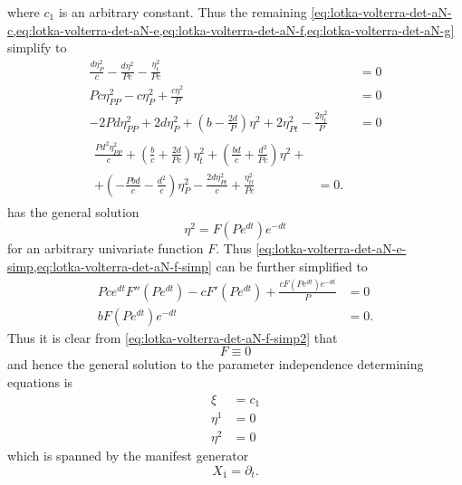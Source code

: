 where \(c_1\) is an arbitrary constant.
Thus the remaining \cref{eq:lotka-volterra-det-aN-c,eq:lotka-volterra-det-aN-e,eq:lotka-volterra-det-aN-f,eq:lotka-volterra-det-aN-g} simplify to
\begin{subequations}
  \begin{align}
    \frac{d \eta^2_{P}}{c} - \frac{d \eta^{2}}{P c} - \frac{\eta^2_{t}}{P c} &= 0 \label{eq:lotka-volterra-det-aN-c-simp}\\
    P c \eta^2_{PP} - c \eta^2_{P} + \frac{c \eta^{2}}{P} &= 0 \label{eq:lotka-volterra-det-aN-e-simp}\\
    - 2 P d \eta^2_{PP} + 2 d \eta^2_{P} + \left(b - \frac{2 d}{P}\right) \eta^{2} + 2 \eta^2_{Pt} - \frac{2 \eta^2_{t}}{P} &= 0 \label{eq:lotka-volterra-det-aN-f-simp}\\
    \begin{split}
      \frac{P d^{2} \eta^2_{PP}}{c} + \left(\frac{b}{c} + \frac{2 d}{P c}\right) \eta^2_{t} + \left(\frac{b d}{c} + \frac{d^{2}}{P c}\right) \eta^{2} +&\\
      + \left(- \frac{P b d}{c} - \frac{d^{2}}{c}\right) \eta^2_{P} - \frac{2 d \eta^2_{Pt}}{c} + \frac{\eta^2_{tt}}{P c} &= 0.
    \end{split}
  \end{align}
\end{subequations}
 has the general solution
\begin{equation*}
  \eta^{2} = F{\left(P e^{d t} \right)} e^{- d t}
\end{equation*}
for an arbitrary univariate function \(F\).
Thus \cref{eq:lotka-volterra-det-aN-e-simp,eq:lotka-volterra-det-aN-f-simp} can be further simplified to
\begin{subequations}
  \begin{align}
    P c e^{d t} F''{\left(P e^{d t} \right)} - c F'{\left(P e^{d t} \right)} + \frac{c F{\left(P e^{d t} \right)} e^{- d t}}{P} &= 0 \label{eq:lotka-volterra-det-aN-e-simp2}\\
    b F{\left(P e^{d t} \right)} e^{- d t} &= 0. \label{eq:lotka-volterra-det-aN-f-simp2}
  \end{align}
\end{subequations}
Thus it is clear from \cref{eq:lotka-volterra-det-aN-f-simp2} that
\begin{equation*}
  F \equiv 0
\end{equation*}
and hence the general solution to the parameter independence determining equations  is
\begin{align*}
  \xi &= c_1 \\
  \eta^1 &= 0\\
  \eta^2 &= 0
\end{align*}
which is spanned by the manifest generator
\begin{equation*}
  X_1 = \partial_t.
\end{equation*}

